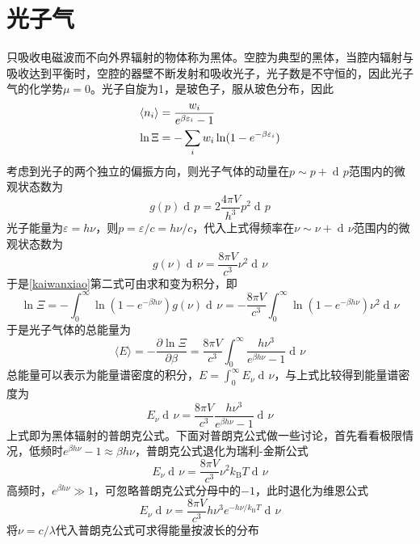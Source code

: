 \documentclass[UTF8,oneside,openany]{ctexbook}
\DeclareMathOperator\dif{d\!}
\newcommand\aver[1]{\langle#1\rangle}
\newcommand\kb{k_{\text{B}}}
\begin{document}
\section{光子气}
只吸收电磁波而不向外界辐射的物体称为黑体。空腔为典型的黑体，当腔内辐射与吸收达到平衡时，空腔的器壁不断发射和吸收光子，光子数是不守恒的，因此光子气的化学势$\mu=0$。光子自旋为1，是玻色子，服从玻色分布，因此
\begin{align}\label{kaiwanxiao}
\aver{n_i}&=\frac{w_i}{e^{\beta\varepsilon_i}-1}\notag\\
\ln\Xi&=-\sum_iw_i\ln(1-e^{-\beta\varepsilon_i})
\end{align}
考虑到光子的两个独立的偏振方向，则光子气体的动量在$p\sim p+\dif p$范围内的微观状态数为
\begin{equation}
g(p)\dif p=2\frac{4\pi V}{h^3}p^2\dif p
\end{equation}
光子能量为$\varepsilon=h\nu$，则$p=\varepsilon/c=h\nu/c$，代入上式得频率在$\nu\sim\nu+\dif\nu$范围内的微观状态数为
\begin{equation}
g(\nu)\dif\nu=\frac{8\pi V}{c^3}\nu^2\dif\nu
\end{equation}
于是\ref{kaiwanxiao}第二式可由求和变为积分，即
\begin{equation}\label{aye}
\ln\Xi=-\int_{0}^{\infty}\ln(1-e^{-\beta h\nu})g(\nu)\dif\nu=-\frac{8\pi V}{c^3}\int_{0}^{\infty}\ln(1-e^{-\beta h\nu})\nu^2\dif\nu
\end{equation}
于是光子气体的总能量为
\begin{equation}
\aver{E}=-\frac{\partial\ln\Xi}{\partial\beta}=\frac{8\pi V}{c^3}\int_{0}^{\infty}\frac{h\nu^3}{e^{\beta h\nu}-1}\dif\nu
\end{equation}
总能量可以表示为能量谱密度的积分，$E=\int_{0}^{\infty}E_{\nu}\dif\nu$，与上式比较得到能量谱密度为
\begin{equation}
E_{\nu}\dif\nu=\frac{8\pi V}{c^3}\frac{h\nu^3}{e^{\beta h\nu}-1}\dif\nu
\end{equation}
上式即为黑体辐射的普朗克公式。下面对普朗克公式做一些讨论，首先看看极限情况，低频时$e^{\beta h\nu}-1\approx\beta h\nu$，普朗克公式退化为瑞利-金斯公式
\begin{equation}
E_{\nu}\dif\nu=\frac{8\pi V}{c^3}\nu^2\kb T\dif\nu
\end{equation}
高频时，$e^{\beta h\nu}\gg1$，可忽略普朗克公式分母中的$-1$，此时退化为维恩公式
\begin{equation}
E_{\nu}\dif\nu=\frac{8\pi V}{c^3}h\nu^3e^{-h\nu/\kb T}\dif\nu
\end{equation}
将$\nu=c/\lambda$代入普朗克公式可求得能量按波长的分布
\end{document}
